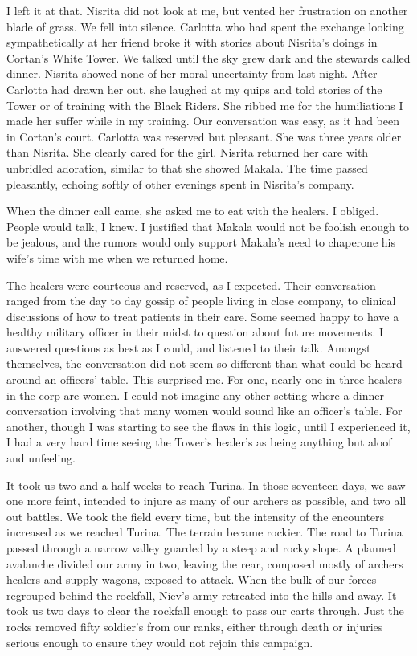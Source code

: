\documentclass{article}
\begin{document}
I left it at that. Nisrita did not look at me, but vented her frustration on another blade of grass. We fell into silence. Carlotta who had spent the exchange looking sympathetically at her friend broke it with stories about Nisrita's doings in Cortan's White Tower. We talked until the sky grew dark and the stewards called dinner. Nisrita showed none of her moral uncertainty from last night. After Carlotta had drawn her out, she laughed at my quips and told stories of the Tower or of training with the Black Riders. She ribbed me for the humiliations I made her suffer while in my training. Our conversation was easy, as it had been in Cortan's court. Carlotta was reserved but pleasant. She was three years older than Nisrita. She clearly cared for the girl. Nisrita returned her care with unbridled adoration, similar to that she showed Makala. The time passed pleasantly, echoing softly of other evenings spent in Nisrita's company. 

When the dinner call came, she asked me to eat with the healers. I obliged. People would talk, I knew. I justified that Makala would not be foolish enough to be jealous, and the rumors would only support Makala's need to chaperone his wife's time with me when we returned home.

The healers were courteous and reserved, as I expected. Their conversation ranged from the day to day gossip of people living in close company, to clinical discussions of how to treat patients in their care. Some seemed happy to have a healthy military officer in their midst to question about future movements. I answered questions as best as I could, and listened to their talk. Amongst themselves, the conversation did not seem so different than what could be heard around an officers' table. This surprised me. For one, nearly one in three healers in the corp are women. I could not imagine any other setting where a dinner conversation involving that many women would sound like an officer's table. For another, though I was starting to see the flaws in this logic, until I experienced it, I had a very hard time seeing the Tower's healer's as being anything but aloof and unfeeling.

It took us two and a half weeks to reach Turina. In those seventeen days, we saw one more feint, intended to injure as many of our archers as possible, and two all out battles. We took the field every time, but the intensity of the encounters increased as we reached Turina. The terrain became rockier. The road to Turina passed through a narrow valley guarded by a steep and rocky slope. A planned avalanche divided our army in two, leaving the rear, composed mostly of  archers healers and supply wagons, exposed to attack. When the bulk of our forces regrouped behind the rockfall, Niev's army retreated into the hills and away. It took us two days to clear the rockfall enough to pass our carts through. Just the rocks removed fifty soldier's from our ranks, either through death or injuries serious enough to ensure they would not rejoin this campaign.
\end{document}
